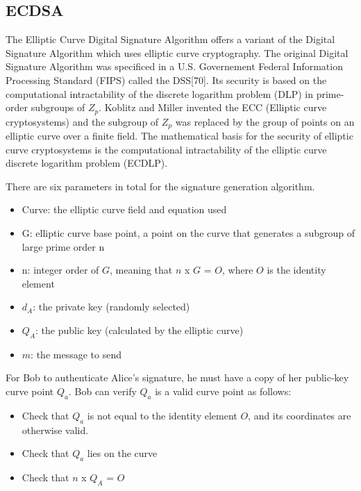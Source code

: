 \documentclass{article}
\begin{document}
\subsection{ECDSA}

The Elliptic Curve Digital Signature Algorithm offers a variant of the Digital Signature Algorithm which uses elliptic curve cryptography. The original Digital Signature Algorithm was specificed in a U.S. Governement Federal Information Processing Standard (FIPS) called the DSS[70]. Its security is based on the computational intractability of the discrete logarithm problem (DLP) in prime-order subgroups of $Z_p$. Koblitz and Miller invented the ECC (Elliptic curve cryptosystems) and the subgroup of $Z_p$ was replaced by the group of points on an elliptic curve over a finite field. The mathematical basis for the security of elliptic curve cryptosystems is the computational intractability of the elliptic curve discrete logarithm problem (ECDLP).

There are six parameters in total for the signature generation algorithm.


\begin{itemize}
    \item Curve: the elliptic curve field and equation used
    \item G: elliptic curve base point, a point on the curve that generates a subgroup of large prime order n
    \item n: integer order of $G$, meaning that $n$ x $G$ = $O$, where $O$ is the identity element
    \item $d_A$: the private key (randomly selected)
    \item $Q_A$: the public key (calculated by the elliptic curve)
    \item $m$: the message to send
\end{itemize}


For Bob to authenticate Alice's signature, he must have a copy of her public-key curve point $Q_a$. Bob can verify $Q_a$ is a valid curve point as follows:

\begin{itemize}
  \item Check that $Q_a$ is not equal to the identity element $O$, and its coordinates are otherwise valid.
  \item Check that $Q_a$ lies on the curve
  \item Check that $n$ x $Q_A$ = $O$
\end{itemize}
\end{document}
